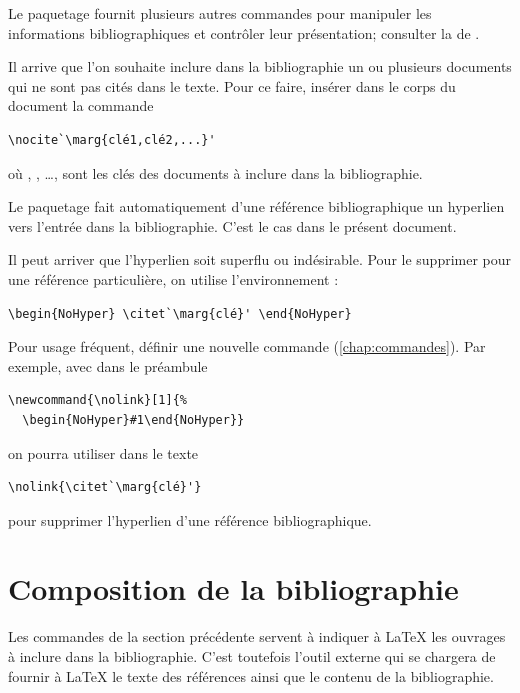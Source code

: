 Le paquetage fournit plusieurs autres commandes pour manipuler les
informations bibliographiques et contrôler leur présentation;
consulter la %
de .

Il arrive que l'on souhaite inclure dans la bibliographie un ou
plusieurs documents qui ne sont pas cités dans le texte. Pour ce
faire, insérer dans le corps du document la commande
\begin{lstlisting}
\nocite`\marg{clé1,clé2,...}'
\end{lstlisting}
où , , \dots, sont les clés des documents à
inclure dans la bibliographie.

\begin{conseil}
  Le paquetage  fait
  automatiquement d'une référence bibliographique un hyperlien vers
  l'entrée dans la bibliographie. C'est le cas dans le présent
  document.

  Il peut arriver que l'hyperlien soit superflu ou indésirable. Pour
  le supprimer pour une référence particulière, on utilise
  l'environnement :
\begin{lstlisting}
\begin{NoHyper} \citet`\marg{clé}' \end{NoHyper}
\end{lstlisting}
  Pour usage fréquent, définir une nouvelle commande
  (\autoref{chap:commandes}). Par exemple, avec dans le préambule
\begin{lstlisting}
\newcommand{\nolink}[1]{%
  \begin{NoHyper}#1\end{NoHyper}}
\end{lstlisting}
  on pourra utiliser dans le texte
\begin{lstlisting}
\nolink{\citet`\marg{clé}'}
\end{lstlisting}
  pour supprimer l'hyperlien d'une référence bibliographique.
\end{conseil}



\section{Composition de la bibliographie}
\label{sec:bibliographie:bibtex}

Les commandes de la section précédente servent à indiquer à {\LaTeX}
les ouvrages à inclure dans la bibliographie. C'est toutefois l'outil
externe {\BibTeX} qui se chargera de fournir à {\LaTeX} le texte des
références ainsi que le contenu de la bibliographie.

